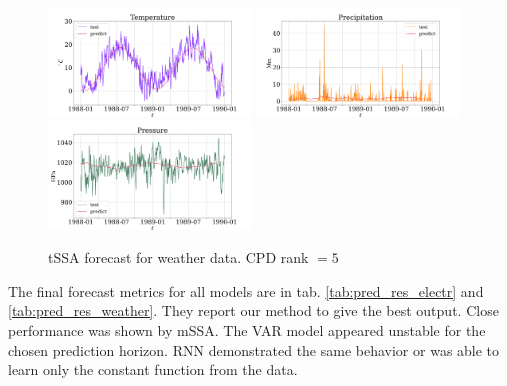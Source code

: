 \documentclass[referee, pdflatex]{sn-jnl}
\theoremstyle{definition}
\theoremstyle{plain}
\begin{document}
	\begin{figure}[h]
		\centering
		\includegraphics[width=0.48\textwidth, keepaspectratio]{../../experiments/weather/tssa/figs/prediction/cpd_rank_5/Temperature.png}
		\includegraphics[width=0.48\textwidth, keepaspectratio]{../../experiments/weather/tssa/figs/prediction/cpd_rank_5/Precipitation.png}
		\includegraphics[width=0.48\textwidth, keepaspectratio]{../../experiments/weather/tssa/figs/prediction/cpd_rank_5/Pressure.png}
		\caption{tSSA forecast for weather data. CPD rank $ = 5 $}\label{fig:tssa_weather_pred}
	\end{figure}
	
	The final forecast metrics for all models are in tab. \ref{tab:pred_res_electr} and \ref{tab:pred_res_weather}. They report our method to give the best output. Close performance was shown by mSSA. The VAR model appeared unstable for the chosen prediction horizon. RNN demonstrated the same behavior or was able to learn only the constant function from the data.
	
\end{document}
